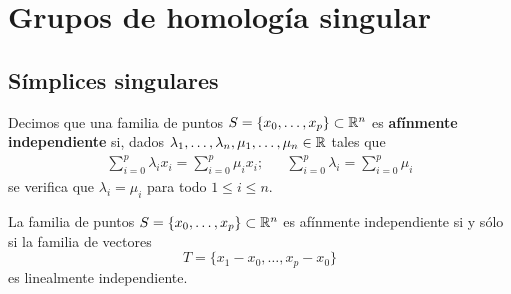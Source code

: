 \setchapterpreamble[u]{\margintoc}

\chapter{Grupos de homología singular}
\section{Símplices singulares}
Decimos que una familia de puntos $S=\{x_0, \dots, x_p\} \subset \mathbb{R}^n$ es \textbf{afínmente independiente} si, dados $\lambda_1,\dots,\lambda_n, \mu_1,\dots,\mu_n \in \mathbb{R}$ tales que
	\begin{align*}
		\sum^p_{i=0}\lambda_ix_i=\sum^p_{i=0}\mu_ix_i; && \sum^p_{i=0}\lambda_i=\sum^p_{i=0}\mu_i
	\end {align*}
se verifica que $\lambda_i=\mu_i$ para todo $1\leq i \leq n$.

\begin{proposition}
	La familia de puntos $S=\{x_0, \dots, x_p\} \subset \mathbb{R}^n$ es afínmente independiente si y sólo si la familia de vectores
		\[T=\{x_1-x_0,\dots,x_p-x_0\}\]
	es linealmente independiente.
\end{proposition}

